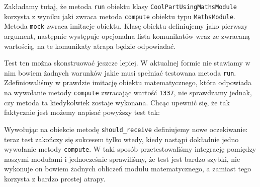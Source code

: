     
    
    Zakładamy tutaj, że metoda \verb+run+ obiektu klasy \verb+CoolPartUsingMathsModule+ korzysta z wyniku jaki zwraca metoda \verb+compute+ obiektu typu \verb+MathsModule+. Metoda \verb+mock+ zwraca imitacje obiektu. Klasę obiektu definiujemy jako pierwszy argument, następnie występuje opcjonalna lista komunikatów wraz ze zwracaną wartością, na te komunikaty atrapa będzie odpowiadać.
    
    Test ten można skonstruować jeszcze lepiej. W aktualnej formie nie stawiamy w nim bowiem żadnych warunków jakie musi spełniać testowana metoda \verb+run+. Zdefiniowaliśmy w prawdzie imitację obiektu matematycznego, która odpowiada na wywołanie metody \verb+compute+ zwracając wartość \verb+1337+, nie sprawdzamy jednak, czy metoda ta kiedykolwiek zostaje wykonana. Chcąc upewnić się, że tak faktycznie jest możemy napisać powyższy test tak:
    
    

    
    Wywołując na obiekcie metodę \verb+should_receive+ definiujemy nowe oczekiwanie: teraz test zakończy się sukcesem tylko wtedy, kiedy nastąpi dokładnie jedno wywołanie metody \verb+compute+. W taki sposób przetestowaliśmy integrację pomiędzy naszymi modułami i jednocześnie sprawiliśmy, że test jest bardzo szybki, nie wykonuje on bowiem żadnych obliczeń modułu matematycznego, a zamiast tego korzysta z bardzo prostej atrapy.
